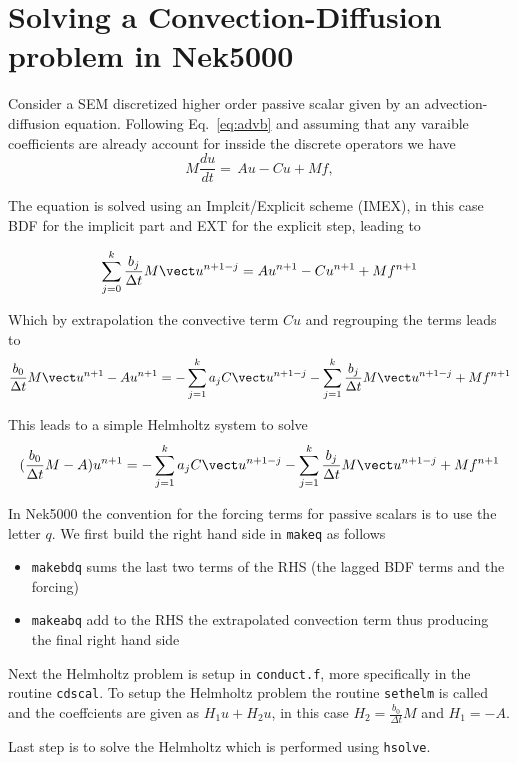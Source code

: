 \section{Solving a Convection-Diffusion problem in Nek5000}


Consider a SEM discretized higher order passive scalar given by an advection-diffusion equation. Following Eq.~\ref{eq:advb} and assuming that any varaible coefficients are already account for insside the discrete operators we have
\begin{equation}\label{eq:passscal}
M \frac{d u}{dt} = \, Au -Cu + M f, 
\end{equation}

The equation is solved using an Implcit/Explicit scheme (IMEX), in this case BDF for the implicit part and EXT for the explicit step, leading to

\begin{equation}
\sum\limits_{j=0}^k \frac{b_j}{\Delta t} M\vect u^{n+1-j}  = Au^{n+1} -Cu^{n+1} + M f^{n+1}
\end{equation}

Which by extrapolation the convective term $Cu$ and regrouping the terms leads to
\begin{equation}
 \frac{b_0}{\Delta t} M\vect u^{n+1} -Au^{n+1} = -\sum\limits_{j=1}^k a_j C\vect u^{n+1-j} -\sum\limits_{j=1}^k \frac{b_j}{\Delta t} M\vect u^{n+1-j}+ M f^{n+1}
\end{equation}


This leads to a simple Helmholtz system to solve
\begin{equation}
 (\frac{b_0}{\Delta t} M -A)u^{n+1} = -\sum\limits_{j=1}^k a_j C\vect u^{n+1-j} -\sum\limits_{j=1}^k \frac{b_j}{\Delta t} M\vect u^{n+1-j}+ M f^{n+1}
\end{equation}

In Nek5000 the convention for the forcing terms for passive scalars is to use the letter $q$. We first build the right hand side in {\tt makeq} as follows
\begin{itemize}
\item {\tt makebdq} sums the last two terms of the RHS (the lagged BDF terms and the forcing)
\item {\tt makeabq} add to the RHS the extrapolated convection term thus producing the final right hand side
\end{itemize}

Next the Helmholtz problem is setup in {\tt conduct.f}, more specifically in the routine {\tt cdscal}. To setup the Helmholtz problem the routine {\tt sethelm} is called and the coeffcients are given as $H_1u+H_2u$, in this case $H_2=\frac{b_0}{\Delta t} M $ and $H_1=-A$.

Last step is to solve the Helmholtz which is performed using {\tt hsolve}.